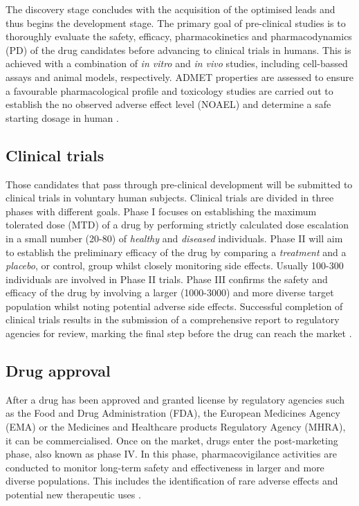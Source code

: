 The discovery stage concludes with the acquisition of the optimised leads and thus begins the development stage. The primary goal of pre-clinical studies is to thoroughly evaluate the safety, efficacy, pharmacokinetics and pharmacodynamics (PD) of the drug candidates before advancing to clinical trials in humans. This is achieved with a combination of \textit{in vitro} and \textit{in vivo} studies, including cell-bassed assays and animal models, respectively. ADMET properties are assessed to ensure a favourable pharmacological profile and toxicology studies are carried out to establish the no observed adverse effect level (NOAEL) and determine a safe starting dosage in human \cite{SHEGOKAR_2020_PRECLINICAL}.

\subsection{Clinical trials}

Those candidates that pass through pre-clinical development will be submitted to clinical trials in voluntary human subjects. Clinical trials are divided in three phases with different goals. Phase I focuses on establishing the maximum tolerated dose (MTD) of a drug by performing strictly calculated dose escalation in a small number (20-80) of \textit{healthy} and \textit{diseased} individuals. Phase II will aim to establish the preliminary efficacy of the drug by comparing a \textit{treatment} and a \textit{placebo}, or control, group whilst closely monitoring side effects. Usually 100-300 individuals are involved in Phase II trials. Phase III confirms the safety and efficacy of the drug by involving a larger (1000-3000) and more diverse target population whilst noting potential adverse side effects. Successful completion of clinical trials results in the submission of a comprehensive report to regulatory agencies for review, marking the final step before the drug can reach the market \cite{UMSCHEID_2011_TRIALS}.

\subsection{Drug approval}

After a drug has been approved and granted license by regulatory agencies such as the Food and Drug Administration (FDA), the European Medicines Agency (EMA) or the Medicines and Healthcare products Regulatory Agency (MHRA), it can be commercialised. Once on the market, drugs enter the post-marketing phase, also known as phase IV. In this phase, pharmacovigilance activities are conducted to monitor long-term safety and effectiveness in larger and more diverse populations. This includes the identification of rare adverse effects and potential new therapeutic uses \cite{SUVARNA_2010_PHASE4}.

